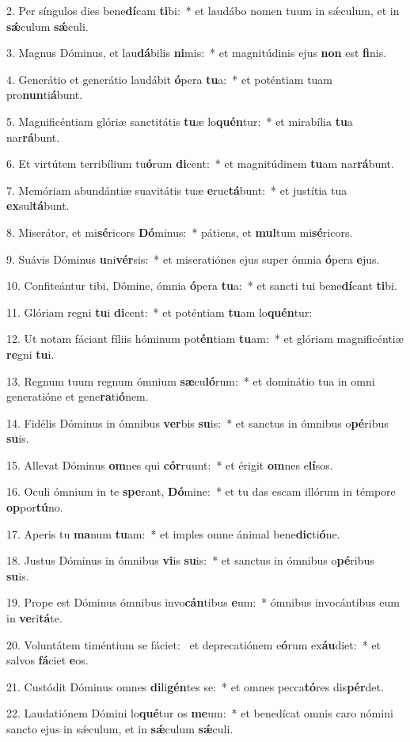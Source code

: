 2. Per síngulos dies bene\textbf{dí}cam \textbf{ti}bi:~*  et laudábo nomen tuum in sǽculum, et in \textbf{sǽ}culum \textbf{sǽ}culi.\

3. Magnus Dóminus, et lau\textbf{dá}bilis \textbf{ni}mis:~*  et magnitúdinis ejus \textbf{non} est \textbf{fi}nis.\

4. Generátio et generátio laudábit \textbf{ó}pera \textbf{tu}a:~*  et poténtiam tuam pro\textbf{nun}ti\textbf{á}bunt.\

5. Magnificéntiam glóriæ sanctitátis \textbf{tu}æ lo\textbf{quén}tur:~*  et mirabília \textbf{tu}a nar\textbf{rá}bunt.\

6. Et virtútem terribílium tu\textbf{ó}rum \textbf{di}cent:~*  et magnitúdinem \textbf{tu}am nar\textbf{rá}bunt.\

7. Memóriam abundántiæ suavitátis tuæ \textbf{e}ruc\textbf{tá}bunt:~*  et justítia tua \textbf{ex}sul\textbf{tá}bunt.\

8. Miserátor, et mi\textbf{sé}ricors \textbf{Dó}minus:~*  pátiens, et \textbf{mul}tum mi\textbf{sé}ricors.\

9. Suávis Dóminus \textbf{u}ni\textbf{vér}sis:~*  et miseratiónes ejus super ómnia \textbf{ó}pera \textbf{e}jus.\

10. Confiteántur tibi, Dómine, ómnia \textbf{ó}pera \textbf{tu}a:~*  et sancti tui bene\textbf{dí}cant \textbf{ti}bi.\

11. Glóriam regni \textbf{tu}i \textbf{di}cent:~*  et poténtiam \textbf{tu}am lo\textbf{quén}tur:\

12. Ut notam fáciant fíliis hóminum pot\textbf{én}tiam \textbf{tu}am:~*  et glóriam magnificéntiæ \textbf{re}gni \textbf{tu}i.\

13. Regnum tuum regnum ómnium \textbf{sæ}cu\textbf{ló}rum:~*  et dominátio tua in omni generatióne et gene\textbf{ra}ti\textbf{ó}nem.\

14. Fidélis Dóminus in ómnibus \textbf{ver}bis \textbf{su}is:~*  et sanctus in ómnibus o\textbf{pé}ribus \textbf{su}is.\

15. Allevat Dóminus \textbf{om}nes qui \textbf{cór}ruunt:~*  et érigit \textbf{om}nes e\textbf{lí}sos.\

16. Oculi ómnium in te \textbf{spe}rant, \textbf{Dó}mine:~*  et tu das escam illórum in témpore \textbf{op}por\textbf{tú}no.\

17. Aperis tu \textbf{ma}num \textbf{tu}am:~*  et imples omne ánimal bene\textbf{dic}ti\textbf{ó}ne.\

18. Justus Dóminus in ómnibus \textbf{vi}is \textbf{su}is:~*  et sanctus in ómnibus o\textbf{pé}ribus \textbf{su}is.\

19. Prope est Dóminus ómnibus invo\textbf{cán}tibus \textbf{e}um:~*  ómnibus invocántibus eum in \textbf{ve}ri\textbf{tá}te.\

20. Voluntátem timéntium se fáciet: \dag\  et deprecatiónem e\textbf{ó}rum ex\textbf{áu}diet:~*  et salvos \textbf{fá}ciet \textbf{e}os.\

21. Custódit Dóminus omnes \textbf{di}li\textbf{gén}tes se:~*  et omnes pecca\textbf{tó}res dis\textbf{pér}det.\

22. Laudatiónem Dómini lo\textbf{qué}tur os \textbf{me}um:~*  et benedícat omnis caro nómini sancto ejus in sǽculum, et in \textbf{sǽ}culum \textbf{sǽ}culi.\

